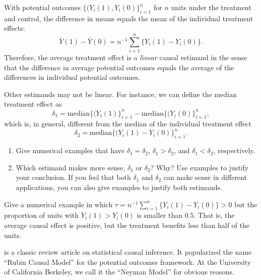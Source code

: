 \begin{HomeworkProblem}\label{exr:2-2}



With potential outcomes $\{  (Y_i(1), Y_i(0) \}_{i=1}^n$ for $n$ units under the treatment and control, the difference in means equals the mean of the individual treatment effects:
\[
\bar{Y}(1) - \bar{Y}(0) = n^{-1} \sum_{i=1}^n  \{ Y_i(1) - Y_i(0) \}.
\]
Therefore, the average treatment effect is a {\it linear} causal estimand in the sense that the difference in average potential outcomes equals the average of the differences in individual potential outcomes.


Other estimands may not be linear. For instance, we can define the median treatment effect as
\[
\delta_1 = \text{median}\{  (Y_i(1) \}_{i=1}^n - \text{median}\{  (Y_i(0) \}_{i=1}^n,
\]
which is, in general, different from the median of the individual treatment effect
\[
\delta_2 = \text{median}\{  (Y_i(1) - Y_i(0) \}_{i=1}^n .
\]

\begin{enumerate}
\item
Give numerical examples that have $\delta_1 = \delta_2$, $\delta_1 > \delta_2$, and $\delta_1 < \delta_2$, respectively.


\item
Which estimand makes more sense, $\delta_1$ or $\delta_2$? Why? Use examples to justify your conclusion. If you feel that both $\delta_1$ and $\delta_2$ can make sense in different applications, you can also give examples to justify both estimands.
\end{enumerate}




\end{HomeworkProblem}

\begin{HomeworkProblem}\label{exr:2-3}

Give a numerical example in which $\tau = n^{-1} \sum_{i=1}^n  \{ Y_i(1) - Y_i(0) \}  >0$ but the proportion of units with $Y_i(1) > Y_i(0)$ is smaller than $0.5$. That is, the average causal effect is positive, but the treatment benefits less than half of the units.


\end{HomeworkProblem}

\begin{HomeworkProblem}\label{exr:2-4}

\citet{holland1986statistics} is a classic review article on statistical causal inference. It popularized the name ``Rubin Causal Model'' for the potential outcomes framework. At the University of California Berkeley, we call it the ``Neyman Model'' for obvious reasons.



\end{HomeworkProblem}
